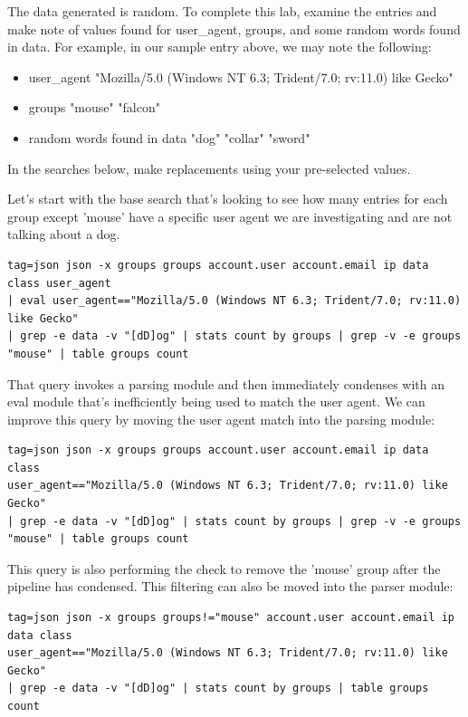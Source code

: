 The data generated is random. To complete this lab, examine the entries and make note of values found for user\_agent, groups, and some random words found in data.
For example, in our sample entry above, we may note the following:
\begin{itemize}
\item user\_agent
\subitem "Mozilla/5.0 (Windows NT 6.3; Trident/7.0; rv:11.0) like Gecko"
\item groups
\subitem "mouse"
\subitem "falcon"
\item random words found in data
\subitem "dog"
\subitem "collar"
\subitem "sword"
\end{itemize}

In the searches below, make replacements using your pre-selected values.

Let's start with the base search that's looking to see how many entries
for each group except 'mouse' have a specific user agent we are
investigating and are not talking about a dog.

\begin{Verbatim}[breaklines=true]
tag=json json -x groups groups account.user account.email ip data class user_agent 
| eval user_agent=="Mozilla/5.0 (Windows NT 6.3; Trident/7.0; rv:11.0) like Gecko" 
| grep -e data -v "[dD]og" | stats count by groups | grep -v -e groups "mouse" | table groups count
\end{Verbatim}

That query invokes a parsing module and then immediately condenses with
an eval module that's inefficiently being used to match the user agent.
We can improve this query by moving the user agent match into the
parsing module:

\begin{Verbatim}[breaklines=true]
tag=json json -x groups groups account.user account.email ip data class 
user_agent=="Mozilla/5.0 (Windows NT 6.3; Trident/7.0; rv:11.0) like Gecko" 
| grep -e data -v "[dD]og" | stats count by groups | grep -v -e groups "mouse" | table groups count
\end{Verbatim}

This query is also performing the check to remove the 'mouse' group
after the pipeline has condensed. This filtering can also be moved into
the parser module:

\begin{Verbatim}[breaklines=true]
tag=json json -x groups groups!="mouse" account.user account.email ip data class 
user_agent=="Mozilla/5.0 (Windows NT 6.3; Trident/7.0; rv:11.0) like Gecko" 
| grep -e data -v "[dD]og" | stats count by groups | table groups count
\end{Verbatim}

